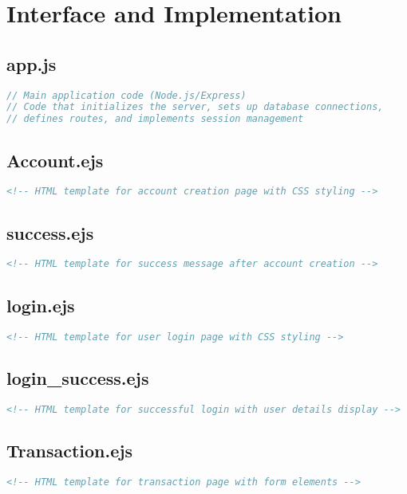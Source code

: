 \documentclass{report}
\begin{document}
\chapter{Interface and Implementation}

\section{app.js}
\begin{lstlisting}[language=JavaScript]
// Main application code (Node.js/Express)
// Code that initializes the server, sets up database connections,
// defines routes, and implements session management
\end{lstlisting}

\section{Account.ejs}
\begin{lstlisting}[language=HTML]
<!-- HTML template for account creation page with CSS styling -->
\end{lstlisting}

\section{success.ejs}
\begin{lstlisting}[language=HTML]
<!-- HTML template for success message after account creation -->
\end{lstlisting}

\section{login.ejs}
\begin{lstlisting}[language=HTML]
<!-- HTML template for user login page with CSS styling -->
\end{lstlisting}

\section{login\_success.ejs}
\begin{lstlisting}[language=HTML]
<!-- HTML template for successful login with user details display -->
\end{lstlisting}

\section{Transaction.ejs}
\begin{lstlisting}[language=HTML]
<!-- HTML template for transaction page with form elements -->
\end{lstlisting}
\end{document}
